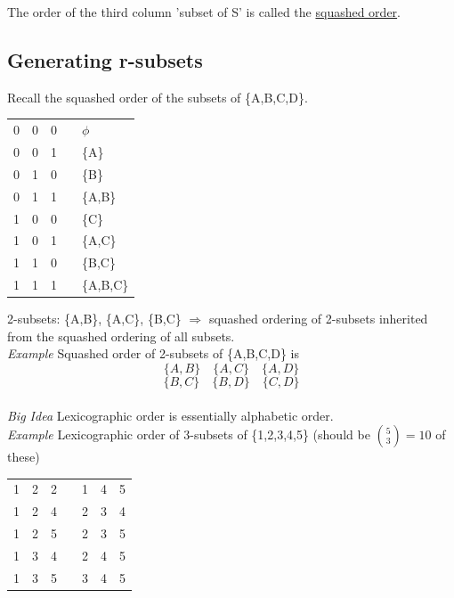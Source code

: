 \documentclass[12pt]{article}
\begin{document}
The order of the third column 'subset of S' is called the \underline{squashed order}.

\subsection{Generating r-subsets}
Recall the squashed order of the subsets of \{A,B,C,D\}. 
\begin{center}
    \begin{tabular}{cccll}
    {0}            & {0}            & {0}            &  & $\phi$    \\
    {0}            & 0                     & 1                     &  & \{A\}     \\
    {0}            & 1                     & 0                     &  & \{B\}     \\
    {0}            & 1                     & 1                     &  & \{A,B\}   \\
    {1}            & 0                     & 0                     &  & \{C\}     \\
    1                     & 0                     & 1                     &  & \{A,C\}   \\
    \multicolumn{1}{l}{1} & \multicolumn{1}{l}{1} & \multicolumn{1}{l}{0} &  & \{B,C\}   \\
    \multicolumn{1}{l}{1} & \multicolumn{1}{l}{1} & \multicolumn{1}{l}{1} &  & \{A,B,C\}
    \end{tabular}
\end{center}
2-subsets: \{A,B\}, \{A,C\}, \{B,C\} $\Rightarrow$ squashed ordering of 2-subsets inherited from the squashed ordering of all subsets.\\

{\sl Example} Squashed order of 2-subsets of \{A,B,C,D\} is 
$$\{A,B\}\quad\{A,C\}\quad\{A,D\}$$
$$\{B,C\}\quad\{B,D\}\quad\{C,D\}$$\\

{\sl Big Idea} Lexicographic order is essentially alphabetic order.\\

{\sl Example} Lexicographic order of 3-subsets of \{1,2,3,4,5\} (should be $\binom{5}{3}=10$ of these)
\begin{center}
    \begin{tabular}{cccllll}
        1 & 2 & 2 &  & 1 & 4 & 5 \\
        1 & 2 & 4 &  & 2 & 3 & 4 \\
        1 & 2 & 5 &  & 2 & 3 & 5 \\
        1 & 3 & 4 &  & 2 & 4 & 5 \\
        1 & 3 & 5 &  & 3 & 4 & 5
        \end{tabular}
\end{center}
\end{document}
